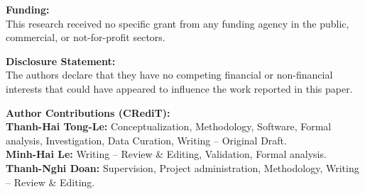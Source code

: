 \documentclass[]{interact}
\begin{document}
\vspace{0.5cm}
\textbf{Funding:} \\
This research received no specific grant from any funding agency in the public, commercial, or not-for-profit sectors.

\vspace{0.5cm}
\textbf{Disclosure Statement:} \\
The authors declare that they have no competing financial or non-financial interests that could have appeared to influence the work reported in this paper.

\vspace{0.5cm}
\textbf{Author Contributions (CRediT):} \\
\textbf{Thanh-Hai Tong-Le:} Conceptualization, Methodology, Software, Formal analysis, Investigation, Data Curation, Writing -- Original Draft. \\
\textbf{Minh-Hai Le:} Writing -- Review \& Editing, Validation, Formal analysis. \\
\textbf{Thanh-Nghi Doan:} Supervision, Project administration, Methodology, Writing -- Review \& Editing.
\end{document}
